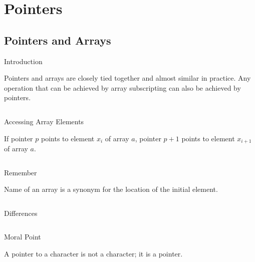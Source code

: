 \documentclass[compress]{beamer}
\begin{document}
\prepareCover

\section{Pointers}

\subsection{Pointers and Arrays}

\begin{slide}
	\begin{block}{Introduction}

	Pointers and arrays are closely tied together and almost similar in practice.
	Any operation that can be achieved by array subscripting can also be achieved by pointers.

	\inputminted[fontsize=\footnotesize, firstline=14, lastline=17, linenos]{c}{
		\resDirectory/ls11-array1.c
	}

	\end{block}
\end{slide}

\begin{slide}
	\begin{block}{Accessing Array Elements}

	If pointer $p$ points to element $x_i$ of array $a$, pointer $p+1$ points to element $x_{i + 1}$ of array $a$.

	\inputminted[fontsize=\footnotesize, firstline=14, lastline=19, linenos]{c}{
		\resDirectory/ls11-array1.c
	}

	\end{block}
\end{slide}

\begin{slide}
	\begin{block}{Remember}

	Name of an array is a synonym for the location of the initial element.

	\inputminted[fontsize=\footnotesize, firstline=14, lastline=19, linenos]{c}{
		\resDirectory/ls11-array2.c
	}

	\end{block}
\end{slide}

\begin{slide}
	\begin{block}{Differences}

	\inputminted[fontsize=\footnotesize, firstline=15, lastline=23, linenos]{c}{
		\resDirectory/ls11-string1.c
	}

	\end{block}
	\begin{block}{Moral Point}

	A pointer to a character is not a character; it is a pointer.

	\end{block}
\end{slide}
\end{document}
